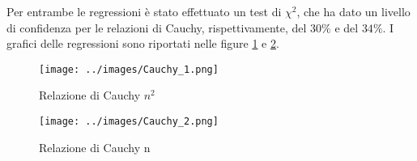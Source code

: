 \documentclass{article}
\begin{document}
        Per entrambe le regressioni è stato effettuato un test di $\chi^2$, che ha dato un livello di confidenza per le relazioni di Cauchy, rispettivamente, 
        del $30\%$ e del $34\%$. I grafici delle regressioni sono riportati nelle figure \ref{figure:Cauchy_1} e \ref{figure:Cauchy_2}. 

        \begin{figure} [H]

            \centering
            \texttt{[image: ../images/Cauchy\_1.png]}
            \caption{Relazione di Cauchy $n^2$}
            \label{figure:Cauchy_1}

        \end{figure}

        \begin{figure} [H]

            \centering
            \texttt{[image: ../images/Cauchy\_2.png]}
            \caption{Relazione di Cauchy n}
            \label{figure:Cauchy_2}

        \end{figure}
        
\end{document}
